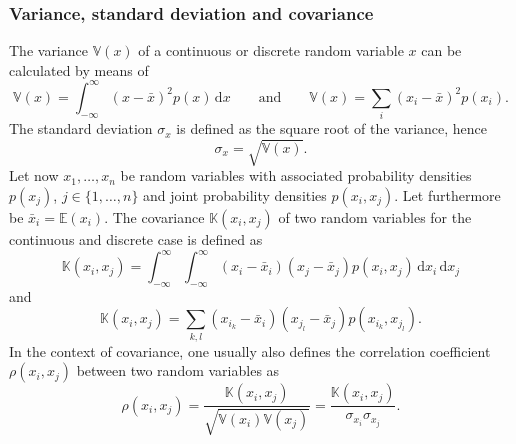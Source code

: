 \documentclass[a4paper,11pt]{article}
\numberwithin{equation}{section}
\begin{document}
\subsubsection{Variance, standard deviation and covariance}
The variance $\mathbb{V}(x)$ of a continuous or discrete random variable $x$ can be calculated by means of \begin{equation}
	\mathbb{V}(x) = \int_{-\infty}^{\infty} (x-\bar{x})^2p(x)\,\mathrm{d}x \qquad \text{and} \qquad \mathbb{V}(x) = \sum_{i} (x_i-\bar{x})^2p(x_i).
\end{equation}
The standard deviation $\sigma_x$ is defined as the square root of the variance, hence \begin{equation}
	\sigma_x = \sqrt{\mathbb{V}(x)}.
\end{equation}
Let now $x_1,\dots,x_n$ be random variables with associated probability densities $p(x_j)$, $j\in \{1,\dots,n\}$ and joint probability densities $p(x_i,x_j)$. Let furthermore be $\bar{x}_i = \mathbb{E}(x_i)$. The covariance $\mathbb{K}(x_i,x_j)$ of two random variables for the continuous and discrete case is defined as \begin{equation}\label{eq:covariance}
	\mathbb{K}(x_i,x_j) = \int_{-\infty}^{\infty}\int_{-\infty}^{\infty}(x_i-\bar{x}_i)(x_j-\bar{x}_j)p(x_i,x_j)\,\mathrm{d}x_i\,\mathrm{d}x_j
\end{equation} and \begin{equation}
	\mathbb{K}(x_i,x_j) = \sum_{k,l}(x_{i_k}-\bar{x}_i)(x_{j_l}-\bar{x}_j)p(x_{i_k},x_{j_l}).
\end{equation} In the context of covariance, one usually also defines the correlation coefficient $\rho(x_i,x_j)$ between two random variables as \begin{equation}\label{eq:correlationcoefficient}
	\rho(x_i,x_j) = \frac{\mathbb{K}(x_i,x_j)}{\sqrt{\mathbb{V}(x_i)\mathbb{V}(x_j)}} = \frac{\mathbb{K}(x_i,x_j)}{\sigma_{x_i}\sigma_{x_j}}.
\end{equation} %
\end{document}
